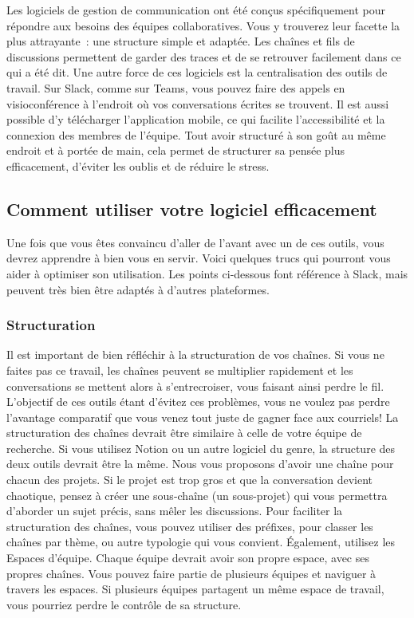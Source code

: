 \documentclass[
  letterpaper,
]{scrbook}
\begin{document}
Les logiciels de gestion de communication ont été conçus spécifiquement
pour répondre aux besoins des équipes collaboratives. Vous y trouverez
leur facette la plus attrayante~: une structure simple et adaptée. Les
chaînes et fils de discussions permettent de garder des traces et de se
retrouver facilement dans ce qui a été dit. Une autre force de ces
logiciels est la centralisation des outils de travail. Sur Slack, comme
sur Teams, vous pouvez faire des appels en visioconférence à l'endroit
où vos conversations écrites se trouvent. Il est aussi possible d'y
télécharger l'application mobile, ce qui facilite l'accessibilité et la
connexion des membres de l'équipe. Tout avoir structuré à son goût au
même endroit et à portée de main, cela permet de structurer sa pensée
plus efficacement, d'éviter les oublis et de réduire le stress.

\hypertarget{comment-utiliser-votre-logiciel-efficacement}{%
\subsection{Comment utiliser votre logiciel
efficacement}\label{comment-utiliser-votre-logiciel-efficacement}}

Une fois que vous êtes convaincu d'aller de l'avant avec un de ces
outils, vous devrez apprendre à bien vous en servir. Voici quelques
trucs qui pourront vous aider à optimiser son utilisation. Les points
ci-dessous font référence à Slack, mais peuvent très bien être adaptés à
d'autres plateformes.

\hypertarget{structuration}{%
\subsubsection{Structuration}\label{structuration}}

Il est important de bien réfléchir à la structuration de vos chaînes. Si
vous ne faites pas ce travail, les chaînes peuvent se multiplier
rapidement et les conversations se mettent alors à s'entrecroiser, vous
faisant ainsi perdre le fil. L'objectif de ces outils étant d'évitez ces
problèmes, vous ne voulez pas perdre l'avantage comparatif que vous
venez tout juste de gagner face aux courriels! La structuration des
chaînes devrait être similaire à celle de votre équipe de recherche. Si
vous utilisez Notion ou un autre logiciel du genre, la structure des
deux outils devrait être la même. Nous vous proposons d'avoir une chaîne
pour chacun des projets. Si le projet est trop gros et que la
conversation devient chaotique, pensez à créer une sous-chaîne (un
sous-projet) qui vous permettra d'aborder un sujet précis, sans mêler
les discussions. Pour faciliter la structuration des chaînes, vous
pouvez utiliser des préfixes, pour classer les chaînes par thème, ou
autre typologie qui vous convient. Également, utilisez les Espaces
d'équipe. Chaque équipe devrait avoir son propre espace, avec ses
propres chaînes. Vous pouvez faire partie de plusieurs équipes et
naviguer à travers les espaces. Si plusieurs équipes partagent un même
espace de travail, vous pourriez perdre le contrôle de sa structure.
\end{document}
